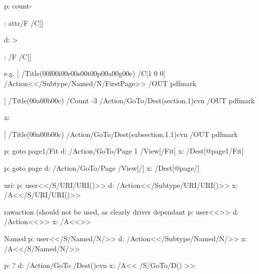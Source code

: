  p: \pdfoutline\BKM@attr\BKM@action
                count\ifBKM@DO@open\else-\fi\BKM@x@childs
                {\BKM@DO@title}%
                
   \BKM@attr: attr{/F \BKM@DO@flags /C[\BKM@DO@color]}              

d:  \BKM@write{[}%
    \ifnum\BKM@x@childs>\z@
    \fi
    \ifx\BKM@attr\@empty
    \else
      \BKM@write{\BKM@attr}%
    \fi
    \BKM@write{\BKM@action}%
    
  \BKM@attr: /F \BKM@DO@flags /C[\BKM@DO@color]
    
e.g. 
[ /Title(\000f\000i\000r\000s\000t\000p\000a\000g\000e)
/C[1 0 0]
/Action<</Subtype/Named/N/FirstPage>>
/OUT pdfmark 

[
/Title(\000a\000b\000c)
/Count -3
/Action/GoTo/Dest(section.1)cvn
/OUT pdfmark

   
 x: %

[
/Title(\000a\000b\000c)
/Action/GoTo/Dest(subsection.1.1)cvn
/OUT pdfmark


p: goto page1{/Fit}
d: /Action/GoTo/Page 1 /View[/Fit]%
x: /Dest[@page1/Fit]

p: goto page\BKM@DO@page{/\BKM@DO@view} 
d: /Action/GoTo/Page \BKM@DO@page/View[/\BKM@DO@view]
x: /Dest[@page\BKM@page/\BKM@view]

uri:
p: user{<</S/URI/URI(\BKM@DO@uri)>>}
d: /Action<</Subtype/URI/URI(\BKM@DO@uri)>>%
x:  /A<</S/URI/URI(\BKM@uri)>>%

rawaction (should not be used, as clearly driver dependant
p:  user{<<\BKM@DO@rawaction>>}%
d:  /Action<<\BKM@DO@rawaction>>
x: /A<<\BKM@rawaction>>

Named
p: user{<</S/Named/N/\BKM@DO@named>>}
d: /Action<</Subtype/Named/N/\BKM@DO@named>>%
x: /A<</S/Named/N/\BKM@named>>%

p: \BKM@DefGotoNameAction\BKM@action\BKM@DO@dest ?
d: /Action/GoTo /Dest(\BKM@DO@dest)cvn%
x: /A<< /S/GoTo/D(\BKM@dest) >>%

